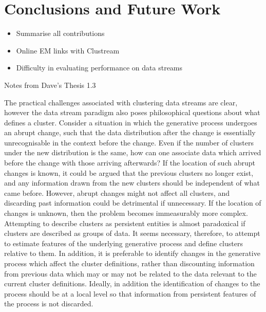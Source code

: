 

\chapter{Conclusions and Future Work}
\label{chap:conc}
\begin{itemize}
\item Summarise all contributions
\item Online EM links with Clustream
\item Difficulty in evaluating performance on data streams
\end{itemize}


Notes from Dave's Thesis 1.3

The practical challenges associated with clustering data streams are clear,
however the data stream paradigm also poses philosophical questions about
what defines a cluster. Consider a situation in which the generative process
undergoes an abrupt change, such that the data distribution after the change
is essentially unrecognisable in the context before the change. Even if the
number of clusters under the new distribution is the same, how can one associate
data which arrived before the change with those arriving afterwards?
If the location of such abrupt changes is known, it could be argued that
the previous clusters no longer exist, and any information drawn from the
new clusters should be independent of what came before. However, abrupt
changes might not affect all clusters, and discarding past information could
be detrimental if unnecessary. If the location of changes is unknown, then
the problem becomes immeasurably more complex. Attempting to describe
clusters as persistent entities is almost paradoxical if clusters are described as
groups of data. It seems necessary, therefore, to attempt to estimate features
of the underlying generative process and define clusters relative to them. In
addition, it is preferable to identify changes in the generative process which
affect the cluster definitions, rather than discounting information from previous
data which may or may not be related to the data relevant to the current
cluster definitions. Ideally, in addition the identification of changes to the
process should be at a local level so that information from persistent features
of the process is not discarded.








